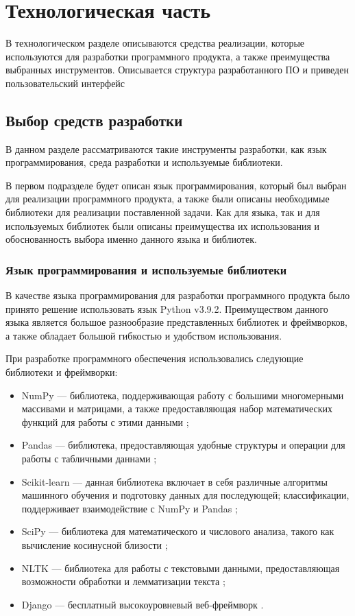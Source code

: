\section{Технологическая часть}

В технологическом разделе описываются средства реализации, которые используются для разработки программного продукта, а также преимущества выбранных инструментов. Описывается структура разработанного ПО и приведен пользовательский интерфейс


\subsection{Выбор средств разработки}

В данном разделе рассматриваются такие инструменты разработки, как язык программирования, среда разработки и используемые библиотеки.

В первом подразделе будет описан язык программирования, который был выбран для реализации программного продукта, а также были описаны необходимые библиотеки для реализации поставленной задачи. Как для языка, так и для используемых библиотек были описаны преимущества их использования и обоснованность выбора именно данного языка и библиотек.

\subsubsection{Язык программирования и используемые библиотеки}

В качестве языка программирования для разработки программного продукта было принято решение использовать язык Python v3.9.2. Преимуществом данного языка является большое разнообразие представленных библиотек и фреймворков, а также обладает большой гибкостью и удобством использования.

При разработке программного обеспечения использовались следующие библиотеки и фреймворки:

\begin{itemize}
	\item NumPy --- библиотека, поддерживающая работу с большими
	многомерными массивами и матрицами, а также предоставляющая
	набор математических функций для работы с этими данными \cite{NumPy};
	\item Pandas --- библиотека, предоставляющая удобные структуры и операции для работы с табличными даннами \cite{Pandas};
	\item Scikit-learn --- данная библиотека включает в себя различные алгоритмы машинного обучения и подготовку данных для последующей;
	классификации, поддерживает взаимодействие с NumPy и Pandas \cite{Scikit-learn};
	\item SciPy --- библиотека для математического и числового анализа, такого как вычисление косинусной близости \cite{SciPy};
	\item NLTK --- библиотека для работы с текстовыми данными, предоставляющая возможности обработки и лемматизации текста \cite{NLTK}; 
	\item Django --- бесплатный высокоуровневый веб-фреймворк \cite{Django}.
\end{itemize}

